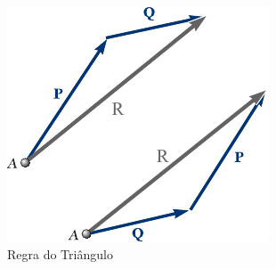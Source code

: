 \documentclass[a4paper, 14pt, twoside]{article}
\begin{document}
\begin{figure}[h]
\begin{minipage}[t]{0.4\textwidth}
    \vspace{-10cm}
    \centering
    \includegraphics[width=0.8\linewidth]{Figuras/somatriang.pdf}
    \caption{Regra do Triângulo}
    \end{minipage}
    \end{figure}
\end{document}
